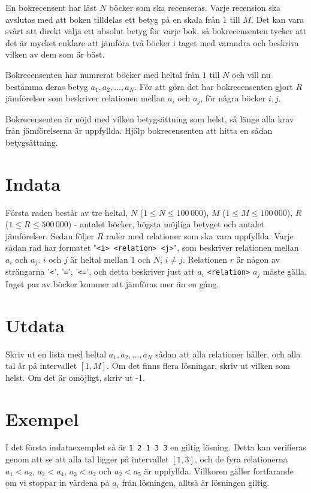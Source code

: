 
En bokrecensent har läst $N$ böcker som ska recenseras. Varje recension ska
avslutas med att boken tilldelas ett betyg på en skala från $1$ till $M$. Det kan
vara svårt att direkt välja ett absolut betyg för varje bok, så
bokrecensenten tycker att det är mycket enklare att jämföra två böcker i
taget med varandra och beskriva vilken av dem som är bäst.

Bokrecensenten har numrerat böcker med heltal från $1$ till $N$ och vill nu
bestämma deras betyg $a_1, a_2, \dots , a_N$. För att göra det har
bokrecensenten gjort $R$ jämförelser som beskriver relationen mellan $a_i$ och
$a_j$, för några böcker $i, j$.

Bokrecensenten är nöjd med vilken betygsättning som helst, så länge alla krav
från jämförelserna är uppfyllda. Hjälp bokrecensenten att hitta en sådan
betygsättning.

\section*{Indata}

Första raden består av tre heltal, $N$ ($1 \leq N \leq 100\,000$), 
$M$ ($1 \leq M \leq 100\,000$),
$R$ ($1 \leq R \leq 500\,000$) - antalet böcker, högsta möjliga
betyget och antalet jämförelser. Sedan följer $R$ rader med relationer som ska
vara
uppfyllda. Varje sådan rad har formatet "\texttt{<i> <relation> <j>}",
som beskriver relationen mellan $a_i$ och $a_j$. $i$ och $j$ är heltal mellan
$1$ och $N$, $i \neq j$. Relationen $r$ är någon av strängarna '\texttt{<}', '\texttt{=}',
'\texttt{<=}', och detta beskriver just att $a_i$ \texttt{<relation>} $a_j$ måste gälla.
Inget par av böcker kommer att jämföras mer än en gång.

\section*{Utdata}

Skriv ut en lista med heltal $a_1, a_2, \ldots , a_N$ sådan att alla relationer håller, och
alla tal är på intervallet $[1, M]$. Om det finns flera lösningar, skriv ut vilken som helst.
Om det är omöjligt, skriv ut -1.

\section*{Exempel}
I det första indataexemplet så är \texttt{1 2 1 3 3} en giltig lösning. Detta kan verifieras
genom att se att alla tal ligger på intervallet $[1, 3]$, och de fyra relationerna $a_1 < a_2$,
 $a_2 < a_4$, $a_3 < a_2$ och $a_2 < a_5$ är uppfyllda. Villkoren gäller fortfarande om vi stoppar
 in värdena på $a_i$ från lösningen, alltså är lösningen giltig.

